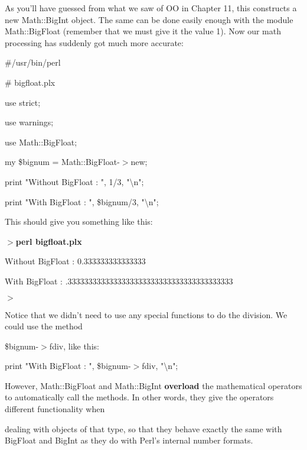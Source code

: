 \documentclass[a4paper,11pt]{book}
\begin{document}
\noindent As you'll have guessed from what we saw of OO in Chapter 11, this constructs a new Math::BigInt object. The same can be done easily enough with the module Math::BigFloat (remember that we must give it the value 1). Now our math processing has suddenly got much more accurate:

\noindent 

\noindent \#/usr/bin/perl

\noindent \# bigfloat.plx

\noindent use strict;

\noindent use warnings;

\noindent 

\noindent 

\noindent use Math::BigFloat;

\noindent 

\noindent my \$bignum = Math::BigFloat-$>$new;

\noindent print "Without BigFloat : ", 1/3, "\textbackslash n";

\noindent print "With BigFloat : ", \$bignum/3, "\textbackslash n";

\noindent 

\noindent This should give you something like this:

\noindent 

\noindent $>$\textbf{perl bigfloat.plx}

\noindent Without BigFloat : 0.333333333333333

\noindent With BigFloat : .3333333333333333333333333333333333333333

\noindent $>$

\noindent 

\noindent Notice that we didn't need to use any special functions to do the division. We could use the method

\noindent \$bignum-$>$fdiv, like this:

\noindent 

\noindent print "With BigFloat : ", \$bignum-$>$fdiv, "\textbackslash n";

\noindent 

\noindent However, Math::BigFloat and Math::BigInt \textbf{overload }the mathematical operators to automatically call the methods. In other words, they give the operators different functionality when

\noindent dealing with objects of that type, so that they behave exactly the same with BigFloat and BigInt as they do with Perl's internal number formats.
\end{document}
